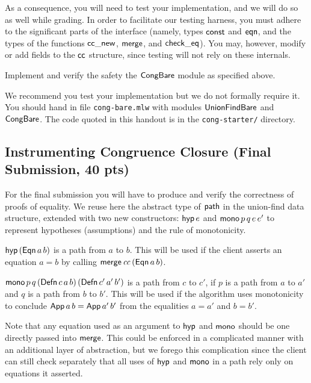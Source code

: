 \documentclass[11pt]{article}
\begin{document}
As a consequence, you will need to test your implementation, and we
will do so as well while grading.  In order to facilitate our testing
harness, you must adhere to the significant parts of the interface
(namely, types $\mathsf{const}$ and $\mathsf{eqn}$, and the types of the
functions $\mathsf{cc\_new}$, $\mathsf{merge}$, and $\mathsf{check\_eq}$).  You may,
however, modify or add fields to the $\mathsf{cc}$ structure, since testing
will not rely on these internals.

\begin{task}[40 pts]
  Implement and verify the safety the $\mathsf{CongBare}$ module as
  specified above.
\end{task}

We recommend you test your implementation but we do not formally require
it.  You should hand in file \verb|cong-bare.mlw| with modules
$\mathsf{UnionFindBare}$ and $\mathsf{CongBare}$.  The code quoted in this
handout is in the \verb|cong-starter/| directory.

\subsection{Instrumenting Congruence Closure (Final Submission, 40 pts)}

For the final submission you will have to produce and verify the
correctness of proofs of equality.  We reuse here the abstract type of
$\mathsf{path}$ in the union-find data structure, extended with two new
constructors: $\mathsf{hyp}\, e$ and $\mathsf{mono}\, p\, q\, e\, e'$ to
represent hypotheses (assumptions) and the rule of monotonicity.

$\mathsf{hyp}\, (\mathsf{Eqn}\, a\, b)$ is a path from $a$ to $b$.  This will be
used if the client asserts an equation $a = b$ by calling
$\mathsf{merge}\, \mathit{cc}\, (\mathsf{Eqn}\, a\, b)$.

$\mathsf{mono}\, p\, q\, (\mathsf{Defn}\, c\, a\, b)\, (\mathsf{Defn}\, c'\, a'\,
b')$ is a path from $c$ to $c'$, if $p$ is a path from $a$ to
$a'$ and $q$ is a path from $b$ to $b'$.  This will be used if the
algorithm uses monotonicity to conclude
$\mathsf{App}\, a\, b = \mathsf{App}\, a'\, b'$ from the equalities $a = a'$ and
$b = b'$.

Note that any equation used as an argument to $\mathsf{hyp}$ and $\mathsf{mono}$
should be one directly passed into $\mathsf{merge}$.  This could be
enforced in a complicated manner with an additional layer of
abstraction, but we forego this complication since the client can
still check separately that all uses of $\mathsf{hyp}$ and $\mathsf{mono}$ in a
path rely only on equations it asserted.
\end{document}
